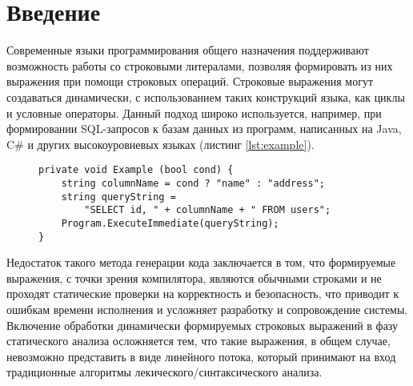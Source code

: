 \section*{Введение}
Современные языки программирования общего назначения поддерживают возможность работы со строковыми литералами, позволяя формировать из них выражения при помощи строковых операций. Строковые выражения могут создаваться динамически, с использованием таких конструкций языка, как циклы и условные операторы. 
Данный подход широко используется, например, при формировании SQL-запросов к базам данных из программ, написанных на Java, C$\#$ и других высокоуровневых языках (листинг \ref{lst:example}).

\begin{figure}[h]	
	\vspace{-10pt}
	\lstset{language=[Sharp]C,
		showstringspaces=false,
		basicstyle=\small,
		keywordstyle=\bfseries,,	
	}
	\begin{lstlisting}[caption={Динамически формируемый SQL-запрос}, label={lst:example}, captionpos=b]
private void Example (bool cond) {
    string columnName = cond ? "name" : "address";
    string queryString = 
        "SELECT id, " + columnName + " FROM users";
    Program.ExecuteImmediate(queryString);
}
	\end{lstlisting}
	\vspace{-10pt}
\end{figure}

Недостаток такого метода генерации кода заключается в том, что формируемые выражения, с точки зрения компилятора, являются обычными строками и не проходят статические проверки на корректность и безопасность, что приводит к ошибкам времени исполнения и усложняет разработку и сопровождение системы. 
Включение обработки динамически формируемых строковых выражений в фазу статического анализа осложняется тем, что такие выражения, в общем случае, невозможно представить в виде линейного потока, который принимают на вход традиционные алгоритмы лекического/синтаксического анализа. 




